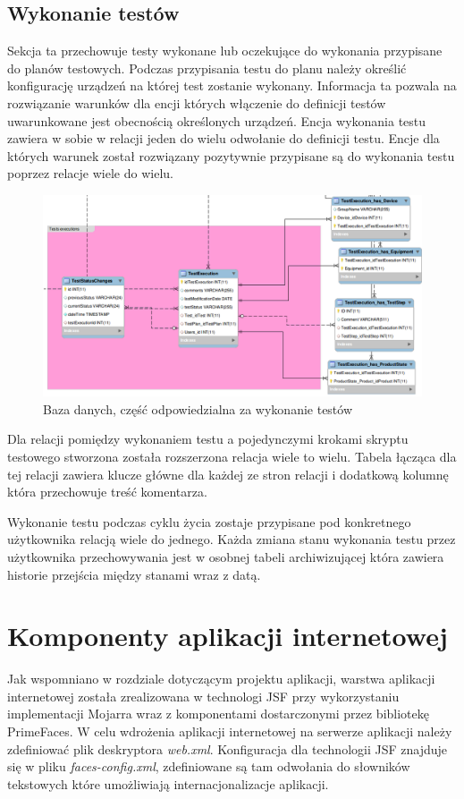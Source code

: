 \subsection{Wykonanie testów} 
Sekcja ta przechowuje testy wykonane lub oczekujące do wykonania przypisane do planów testowych. Podczas przypisania testu do planu należy określić konfigurację urządzeń na której test zostanie wykonany. Informacja ta pozwala na rozwiązanie warunków dla encji których włączenie do definicji testów uwarunkowane jest obecnością określonych urządzeń. Encja wykonania testu zawiera w sobie w relacji jeden do wielu odwołanie do definicji testu. Encje dla których warunek został rozwiązany pozytywnie przypisane są do wykonania testu poprzez relacje wiele do wielu. 
 \begin{figure}[h!]
\centerline{\includegraphics[scale=0.5]{img/bazaDanychWykonanie.png}}
\label{fig:bazaWykonanie}
      \caption{Baza danych, część odpowiedzialna za wykonanie testów}
\end{figure}
Dla relacji pomiędzy wykonaniem testu a pojedynczymi krokami skryptu testowego stworzona została rozszerzona relacja wiele to wielu. Tabela łącząca dla tej relacji zawiera klucze główne dla każdej ze stron relacji i dodatkową kolumnę która przechowuje treść komentarza.

Wykonanie testu podczas cyklu życia zostaje przypisane pod konkretnego użytkownika relacją wiele do jednego. Każda zmiana stanu wykonania testu przez użytkownika przechowywania jest w osobnej tabeli archiwizującej która zawiera historie przejścia między stanami wraz z datą.

\section{Komponenty aplikacji internetowej}

Jak wspomniano w rozdziale dotyczącym projektu aplikacji, warstwa aplikacji internetowej została zrealizowana w technologi JSF przy wykorzystaniu implementacji Mojarra wraz z komponentami dostarczonymi przez bibliotekę PrimeFaces.
W celu wdrożenia aplikacji internetowej na serwerze aplikacji należy zdefiniować plik deskryptora \textit{web.xml}. Konfiguracja dla technologii JSF znajduje się  w pliku \textit{faces-config.xml}, zdefiniowane są tam odwołania do słowników tekstowych które umożliwiają internacjonalizacje aplikacji.

